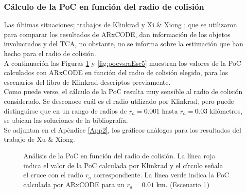 \subsubsection*{C\'alculo de la PoC en funci\'on del radio de colisi\'on}

Las \'ultimas situaciones; trabajos de Klinkrad \citep{Klinkrad} y Xi \& Xiong \citep{xu2014method}; que se utilizaron para comparar los resultados de ARxCODE, dan informaci\'on de los objetos involucrados y del TCA, no obstante, no se informa sobre la estimaci\'on que han hecho para el radio de colisi\'on.\\

A continuaci\'on las Figuras \ref{fig:pocvsraEsc4} y \ref{fig:pocvsraEsc5} muestran los valores de la PoC calculados con ARxCODE en funci\'on del radio de colisi\'on elegido, para los escenarios del libro de Klinkrad descriptos previamente.\\

Como puede verse, el c\'alculo de la PoC resulta muy sensible al radio de colisi\'on considerado. Se desconoce cu\'al es el radio utilizado por Klinkrad, pero puede distinguirse que en un rango de radios de $r_{a}=0.001$ hasta $r_{a}=0.03$ kil\'ometros, se ubican las soluciones de la bibliograf\'ia.\\

Se adjuntan en el Ap\'endice \ref{App2}, los gr\'aficos an\'alogos para los resultados del trabajo de Xu \& Xiong.\\

 
\begin{figure}[!h]
  \centering
  \caption{An\'alisis de la PoC en funci\'on del radio de colisi\'on. La l\'inea roja indica el valor de la PoC calculada por Klinkrad \citep{Klinkrad} y el c\'irculo se\~nala el cruce con el radio $r_{a}$ correspondiente. La l\'inea verde indica la PoC calculada por ARxCODE para un $r_{a}=0.01$ km. (Escenario 1)}
  \label{fig:pocvsraEsc4}
\end{figure}


